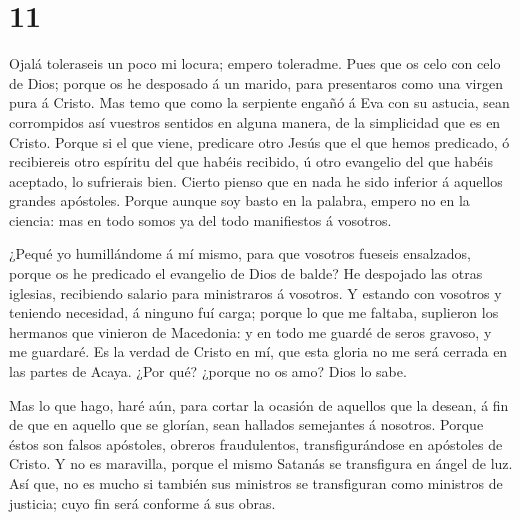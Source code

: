 \hypertarget{section-10}{%
\section{11}\label{section-10}}

 Ojalá toleraseis un poco mi locura; empero toleradme.
 Pues que os celo con celo de Dios; porque os he desposado á
un marido, para presentaros como una virgen pura á Cristo. 
Mas temo que como la serpiente engañó á Eva con su astucia, sean
corrompidos así vuestros sentidos en alguna manera, de la simplicidad
que es en Cristo.  Porque si el que viene, predicare otro
Jesús que el que hemos predicado, ó recibiereis otro espíritu del que
habéis recibido, ú otro evangelio del que habéis aceptado, lo sufrierais
bien.  Cierto pienso que en nada he sido inferior á aquellos
grandes apóstoles.  Porque aunque soy basto en la palabra,
empero no en la ciencia: mas en todo somos ya del todo manifiestos á
vosotros.

 ¿Pequé yo humillándome á mí mismo, para que vosotros
fueseis ensalzados, porque os he predicado el evangelio de Dios de
balde?  He despojado las otras iglesias, recibiendo salario
para ministraros á vosotros.  Y estando con vosotros y
teniendo necesidad, á ninguno fuí carga; porque lo que me faltaba,
suplieron los hermanos que vinieron de Macedonia: y en todo me guardé de
seros gravoso, y me guardaré.  Es la verdad de Cristo en
mí, que esta gloria no me será cerrada en las partes de Acaya.
 ¿Por qué? ¿porque no os amo? Dios lo sabe.

 Mas lo que hago, haré aún, para cortar la ocasión de
aquellos que la desean, á fin de que en aquello que se glorían, sean
hallados semejantes á nosotros.  Porque éstos son falsos
apóstoles, obreros fraudulentos, transfigurándose en apóstoles de
Cristo.  Y no es maravilla, porque el mismo Satanás se
transfigura en ángel de luz.  Así que, no es mucho si
también sus ministros se transfiguran como ministros de justicia; cuyo
fin será conforme á sus obras.

